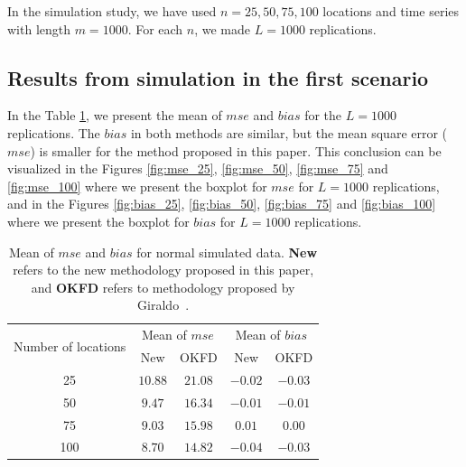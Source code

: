 \documentclass[]{interact}
\theoremstyle{plain}%
\theoremstyle{definition}
\theoremstyle{remark}
\begin{document}
In the simulation study, we have used \(n=25,50,75,100\) locations and time series with length \(m=1000\). For each \(n\), we made \(L=1000\) replications.

\hypertarget{results-from-simulation-in-the-first-scenario}{%
\subsection*{Results from simulation in the first scenario}\label{results-from-simulation-in-the-first-scenario}}

In the Table \ref{tab:summary-normal}, we present the mean of \(mse\) and \(bias\) for the \(L=1000\) replications. The \(bias\) in both methods are similar, but the mean square error (\(mse\)) is smaller for the method proposed in this paper. This conclusion can be visualized in the Figures \ref{fig:mse_25}, \ref{fig:mse_50}, \ref{fig:mse_75} and \ref{fig:mse_100} where we present the boxplot for \(mse\) for \(L=1000\) replications, and in the Figures \ref{fig:bias_25}, \ref{fig:bias_50}, \ref{fig:bias_75} and \ref{fig:bias_100} where we present the boxplot for \(bias\) for \(L=1000\) replications.

\begin{table}[htbp]
 \centering
 \caption{Mean of $mse$ and $bias$ for normal simulated data. \textbf{New} refers to the new methodology proposed in this paper, and \textbf{OKFD} refers to methodology proposed by Giraldo~\cite{giraldo2011ordinary}.}
 \label{tab:summary-normal}
  \begin{tabular}{ccc|cc}
  \toprule
   \multirow{2}{*}{Number of locations}& \multicolumn{2}{c|}{Mean of $mse$} & \multicolumn{2}{|c}{Mean of $bias$}\\ \cmidrule{2-5}
    & New & OKFD & New & OKFD \\ \midrule
    25 & $10.88$ & $21.08$ & $-0.02$ & $-0.03$\\
    50 & $9.47$ & $16.34$ & $-0.01$ & $-0.01$\\
    75 & $9.03$ & $15.98$ & $0.01$ & $0.00$\\
    100 & $8.70$ & $14.82$ & $-0.04$ & $-0.03$\\ \bottomrule
  \end{tabular}
\end{table}
\end{document}
